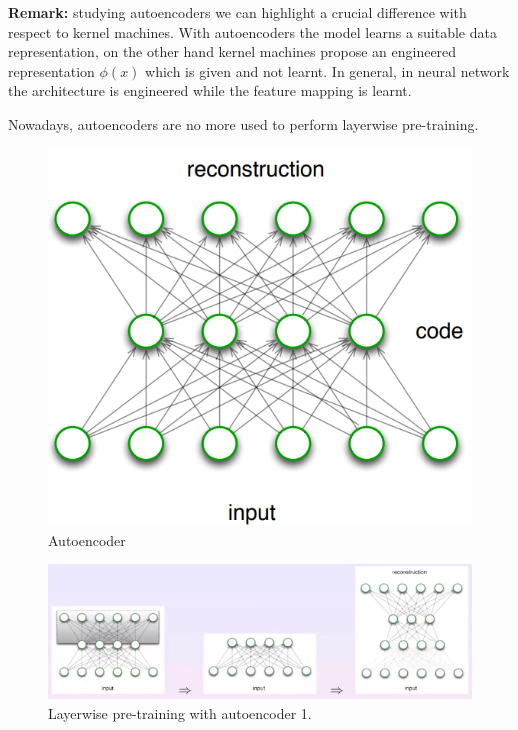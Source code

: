 \textbf{Remark:} studying autoencoders we can highlight a crucial difference with respect to kernel machines. With autoencoders the model learns a suitable data representation, on the other hand kernel machines propose an engineered representation $\phi(x)$ which is given and not learnt. In general, in neural network the architecture is engineered while the feature mapping is learnt. \newline

Nowadays, autoencoders are no more used to perform layerwise pre-training.

\begin{figure}
    \centering
    \includegraphics[scale = 0.5]{images/autoencoder.png}
    \caption{Autoencoder}
    \label{fig:autoencoder}
\end{figure}

\begin{figure}
    \centering
    \includegraphics[width=\textwidth]{images/autoencoder_layerwise1.png}
    \caption{Layerwise pre-training with autoencoder 1.}
    \label{fig:autoencoder_layerwise1}
\end{figure}

